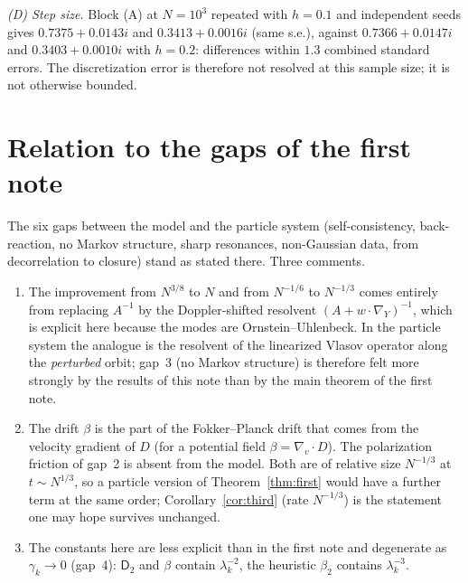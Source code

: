 \documentclass[11pt]{article}
\newcommand{\sD}{\mathsf{D}}
\theoremstyle{remark}
\begin{document}
\emph{(D) Step size.} Block (A) at $N=10^3$ repeated with $h=0.1$ and
independent seeds gives $0.7375+0.0143i$ and $0.3413+0.0016i$ (same s.e.),
against $0.7366+0.0147i$ and $0.3403+0.0010i$ with $h=0.2$: differences
within $1.3$ combined standard errors. The discretization error is therefore
not resolved at this sample size; it is not otherwise bounded.

\section{Relation to the gaps of the first note}

The six gaps between the model and the particle system (self-consistency,
back-reaction, no Markov structure, sharp resonances, non-Gaussian data, from
decorrelation to closure) stand as stated there. Three comments.
\begin{enumerate}
\item The improvement from $N^{3/8}$ to $N$ and from $N^{-1/6}$ to $N^{-1/3}$
comes entirely from replacing $A^{-1}$ by the Doppler-shifted resolvent
$(A + w\cdot\nabla_Y)^{-1}$, which is explicit here because the modes are
Ornstein--Uhlenbeck. In the particle system the analogue is the resolvent of
the linearized Vlasov operator along the \emph{perturbed} orbit; gap~3 (no
Markov structure) is therefore felt more strongly by the results of this
note than by the main theorem of the first note.
\item The drift $\beta$ is the part of the Fokker--Planck drift that comes
from the velocity gradient of $D$ (for a potential field
$\beta = \nabla_v\cdot D$). The polarization friction of gap~2 is absent
from the model. Both are of relative size $N^{-1/3}$ at $t\sim N^{1/3}$, so
a particle version of Theorem~\ref{thm:first} would have a further term at
the same order; Corollary~\ref{cor:third} (rate $N^{-1/3}$) is the statement
one may hope survives unchanged.
\item The constants here are less explicit than in the first note and
degenerate as $\gamma_k\to0$ (gap~4): $\sD_2$ and $\beta$ contain
$\lambda_k^{-2}$, the heuristic $\beta_2$ contains $\lambda_k^{-3}$.
\end{enumerate}
\end{document}
